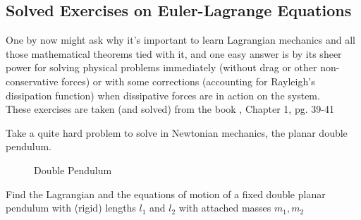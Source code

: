 \documentclass[../admech.tex]{subfiles}
\begin{document}
\subsection{Solved Exercises on Euler-Lagrange Equations}
One by now might ask why it's important to learn Lagrangian mechanics and all those mathematical theorems tied with it, and one easy answer is by its sheer power for solving physical problems immediately (without drag or other non-conservative forces) or with some corrections (accounting for Rayleigh's dissipation function) when dissipative forces are in action on the system.\\
These exercises are taken (and solved) from the book \cite{landau1}, Chapter 1, pg. 39-41
\begin{exe}
	Take a quite hard problem to solve in Newtonian mechanics, the planar double pendulum.\\
	\begin{minipage}[c]{0.5\textwidth}
		\begin{figure}[H]
		\centering
			\caption{Double Pendulum}
		\end{figure}
	\end{minipage}
	\begin{minipage}[l]{0.5\textwidth}
		Find the Lagrangian and the equations of motion of a fixed double planar pendulum with (rigid) lengths $l_1$ and $l_2$ with attached masses $m_1,m_2$
	\end{minipage}\\

\end{exe}
\end{document}
